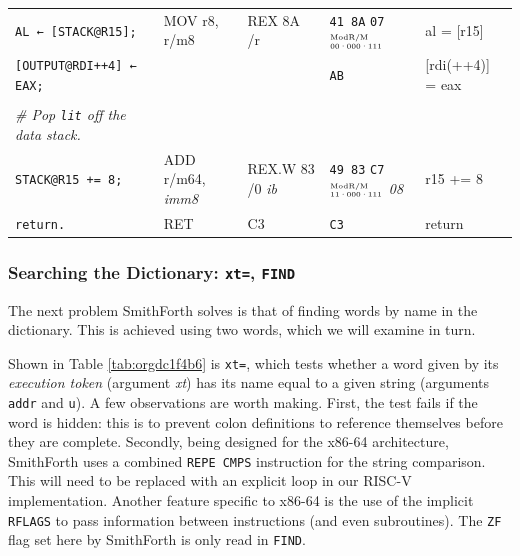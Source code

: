 \documentclass[a4paper,12pt,final]{article}
\begin{document}
\begin{table}[!htbp]
\begin{adjustwidth}{-1cm}{-1cm}
\begin{center}
\begin{tabular}{l|ll|lH}
\texttt{AL ← [STACK@R15];} & MOV r8, r/m8 & REX 8A /r & \texttt{41 8A} \texttt{07}​\(^{\text{\tiny ModR/M}}_{\text{\tiny 00·000·111}}\) & al = [r15]\\[0pt]
\texttt{[OUTPUT@RDI++4] ← EAX;} &  &  & \texttt{AB} & [rdi(++4)] = eax\\[0pt]
 &  &  &  & \\[0pt]
\emph{\# Pop \texttt{lit} off the data stack.} &  &  &  & \\[0pt]
\texttt{STACK@R15 += 8;} & ADD r/m64, \emph{imm8} & REX.W 83 /​0 \emph{ib} & \texttt{49 83} \texttt{C7}​\(^{\text{\tiny ModR/M}}_{\text{\tiny 11·000·111}}\) \emph{08} & r15 += 8\\[0pt]
\texttt{return.} & RET & C3 & \texttt{C3} & return\\[0pt]
\end{tabular}

\end{center}
\normalsize \end{adjustwidth} \end{table} \vspace{0}
\clearpage

\subsubsection{Searching the Dictionary: \texttt{xt=}, \texttt{FIND}}
\label{sec:org542b38b}

The next problem SmithForth solves is that of finding words by name in
the dictionary.  This is achieved using two words, which we will
examine in turn.

Shown in Table \ref{tab:orgdc1f4b6} is \texttt{xt=}, which tests whether a word
given by its \emph{execution token} (argument \emph{xt}) has its name equal to a
given string (arguments \texttt{addr} and \texttt{u}).  A few observations are worth
making.  First, the test fails if the word is hidden: this is to
prevent colon definitions to reference themselves before they are
complete.  Secondly, being designed for the x86-64 architecture,
SmithForth uses a combined \texttt{REPE CMPS} instruction for the string
comparison.  This will need to be replaced with an explicit loop in
our RISC-V implementation.  Another feature specific to x86-64 is the
use of the implicit \texttt{RFLAGS} to pass information between instructions
(and even subroutines).  The \texttt{ZF} flag set here by SmithForth is only
read in \texttt{FIND}.
\end{document}
